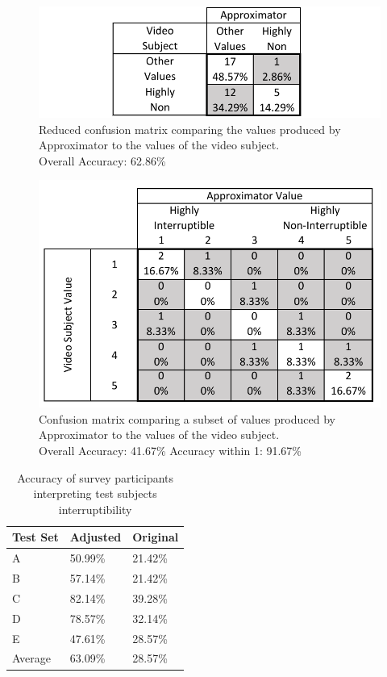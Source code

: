 \documentclass{sigchi}
\begin{document}
\begin{figure}[h]
  \centering
  \includegraphics[width=\columnwidth]{figures/VideoToApproximatorReducedConfusionMatrix.pdf}
  \caption{Reduced confusion matrix comparing the values produced by Approximator to the values of the video subject. \\Overall Accuracy: 62.86\%}
  \label{fig:reduced_video_to_approximator_matrix}
\end{figure}

\begin{figure}[h]
  \centering
  \includegraphics[width=\columnwidth]{figures/VideoToApproximatorConfusionMatrix(AndersValues).pdf}
  \caption{Confusion matrix comparing a subset of values produced by Approximator to the values of the video subject. \\Overall Accuracy: 41.67\% Accuracy within 1: 91.67\%}
  \label{fig:subset_video_to_approximator_matrix}
\end{figure}

\begin{table}[h]
  \centering
  \begin{tabular}{@{}lll@{}}
    \toprule
    Test Set     & Adjusted & Original \\ \midrule
    A       & 50.99\%    & 21.42\%    \\
    B       & 57.14\%    & 21.42\%    \\
    C       & 82.14\%    & 39.28\%    \\
    D       & 78.57\%    & 32.14\%    \\
    E       & 47.61\%    & 28.57\%    \\ \midrule
    Average & 63.09\%    & 28.57\%    \\ \bottomrule
  \end{tabular}
  \caption{Accuracy of survey participants interpreting test subjects interruptibility}
  \label{tab:survey_accuracy}
\end{table}
\end{document}
